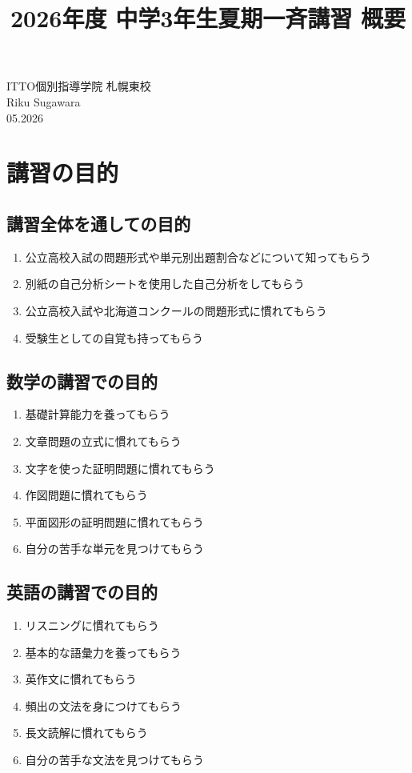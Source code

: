 \documentclass[a4j,12pt]{jsarticle}
\title{2026年度 中学3年生夏期一斉講習 概要}
\author{}
\date{}
\begin{document}
\maketitle
\begin{flushright}
  ITTO個別指導学院 札幌東校\\
  Riku Sugawara\\
  05.2026
\end{flushright}
\vspace{-1.0\baselineskip}
\section{講習の目的}
  \subsection{講習全体を通しての目的}
    \begin{enumerate}
      \item 公立高校入試の問題形式や単元別出題割合などについて知ってもらう
      \item 別紙の自己分析シートを使用した自己分析をしてもらう
      \item 公立高校入試や北海道コンクールの問題形式に慣れてもらう
      \item 受験生としての自覚も持ってもらう
    \end{enumerate}

  \subsection{数学の講習での目的}
    \begin{enumerate}
      \item 基礎計算能力を養ってもらう
      \item 文章問題の立式に慣れてもらう
      \item 文字を使った証明問題に慣れてもらう
      \item 作図問題に慣れてもらう
      \item 平面図形の証明問題に慣れてもらう
      \item 自分の苦手な単元を見つけてもらう
    \end{enumerate}

  \subsection{英語の講習での目的}
    \begin{enumerate}
      \item リスニングに慣れてもらう
      \item 基本的な語彙力を養ってもらう
      \item 英作文に慣れてもらう
      \item 頻出の文法を身につけてもらう
      \item 長文読解に慣れてもらう
      \item 自分の苦手な文法を見つけてもらう
    \end{enumerate}
\newpage
\end{document}
